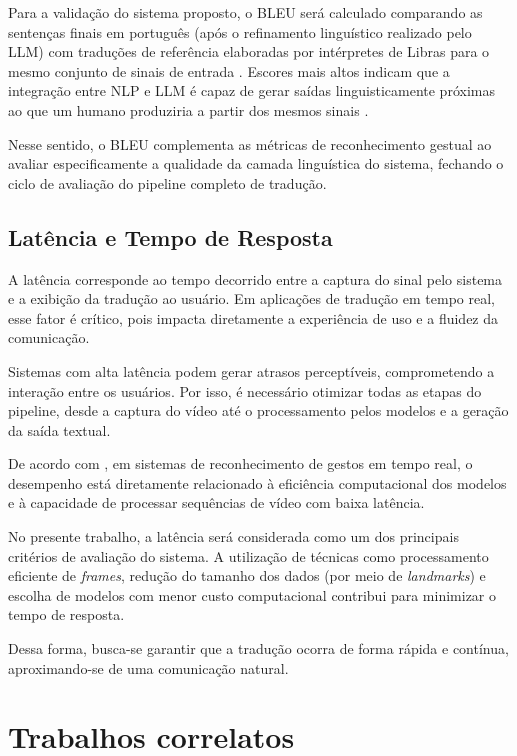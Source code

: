\documentclass[
    12pt,                %
    openright,           %
    oneside,             %
    a4paper,             %
    english,             %
    brazil               %
]{abntex2}
\begin{document}
Para a validação do sistema proposto, o BLEU será calculado comparando as sentenças finais em português (após o refinamento linguístico realizado pelo LLM) com traduções de referência elaboradas por intérpretes de Libras para o mesmo conjunto de sinais de entrada \cite{Touvron2023}. Escores mais altos indicam que a integração entre NLP e LLM é capaz de gerar saídas linguisticamente próximas ao que um humano produziria a partir dos mesmos sinais \cite{Touvron2023}.

Nesse sentido, o BLEU complementa as métricas de reconhecimento gestual ao avaliar especificamente a qualidade da camada linguística do sistema, fechando o ciclo de avaliação do pipeline completo de tradução.

\subsection{Latência e Tempo de Resposta}

A latência corresponde ao tempo decorrido entre a captura do sinal pelo sistema e a exibição da tradução ao usuário. Em aplicações de tradução em tempo real, esse fator é crítico, pois impacta diretamente a experiência de uso e a fluidez da comunicação.

Sistemas com alta latência podem gerar atrasos perceptíveis, comprometendo a interação entre os usuários. Por isso, é necessário otimizar todas as etapas do pipeline, desde a captura do vídeo até o processamento pelos modelos e a geração da saída textual.

De acordo com , em sistemas de reconhecimento de gestos em tempo real, o desempenho está diretamente relacionado à eficiência computacional dos modelos e à capacidade de processar sequências de vídeo com baixa latência.

No presente trabalho, a latência será considerada como um dos principais critérios de avaliação do sistema. A utilização de técnicas como processamento eficiente de \textit{frames}, redução do tamanho dos dados (por meio de \textit{landmarks}) e escolha de modelos com menor custo computacional contribui para minimizar o tempo de resposta.

Dessa forma, busca-se garantir que a tradução ocorra de forma rápida e contínua, aproximando-se de uma comunicação natural.

\section{Trabalhos correlatos}
\label{sec:trabalhos_correlatos}
\end{document}
